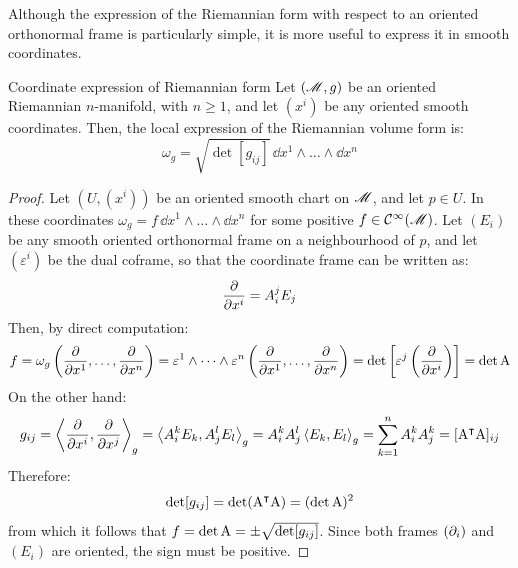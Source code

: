 Although the expression of the Riemannian form with respect to an oriented orthonormal frame is particularly simple, it is more useful to express it in smooth coordinates.

\begin{proposition}{Coordinate expression of Riemannian form}{}
  Let $ (\mathscr{M},g) $ be an oriented Riemannian $ n $-manifold, with $ n \geq 1 $, and let $ (x^i) $ be any oriented smooth coordinates. Then, the local expression of the Riemannian volume form is:
  \begin{equation}
    \omega_g = \sqrt{\det [g_{ij}]} \, \dd x^1 \wedge \dots \wedge \dd x^n
  \end{equation}
\end{proposition}

\begin{proofbox}
  \begin{proof}
    Let $ (U,(x^i)) $ be an oriented smooth chart on $ \mathscr{M} $, and let $ p \in U $. In these coordinates $ \omega_g = f \, \dd x^1 \wedge \dots \wedge \dd x^n $ for some positive $ f \in \mathcal{C}^{\infty}(\mathscr{M}) $. Let $ (E_i) $ be any smooth oriented orthonormal frame on a neighbourhood of $ p $, and let $ (\varepsilon^i) $ be the dual coframe, so that the coordinate frame can be written as:
    \begin{equation*}
      \frac{\partial}{\partial x^i} = A_i^j E_j
    \end{equation*}
    Then, by direct computation:
    \begin{equation*}
      f = \omega_g \left( \frac{\partial}{\partial x^1} , \dots , \frac{\partial}{\partial x^n} \right) = \varepsilon^1 \wedge \dots \wedge \varepsilon^n \left( \frac{\partial}{\partial x^1} , \dots , \frac{\partial}{\partial x^n} \right) = \det \left[ \varepsilon^j \left( \frac{\partial}{\partial x^i} \right) \right] = \det \mathrm{A}
    \end{equation*}
    On the other hand:
    \begin{equation*}
      g_{ij} = \left\langle \frac{\partial}{\partial x^i} , \frac{\partial}{\partial x^j} \right\rangle_g = \left\langle A_i^k E_k , A_j^l E_l \right\rangle_g = A_i^k A_j^l \braket{E_k , E_l}_g = \sum_{k = 1}^n A_i^k A_j^k = [\mathrm{A}^\intercal \mathrm{A}]_{ij}
    \end{equation*}
    Therefore:
    \begin{equation*}
      \det [g_{ij}] = \det (\mathrm{A}^\intercal \mathrm{A}) = (\det \mathrm{A})^2
    \end{equation*}
    from which it follows that $ f = \det \mathrm{A} = \pm \sqrt{\det [g_{ij}]} $. Since both frames $ (\partial_i) $ and $ (E_i) $ are oriented, the sign must be positive.
  \end{proof}
\end{proofbox}

